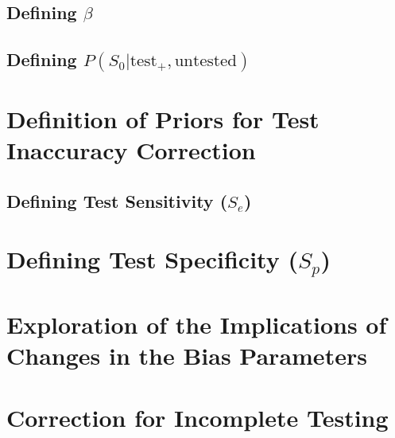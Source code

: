\documentclass[12pt,twoside]{smiththesis}
\begin{document}
\hypertarget{defining-beta}{%
\subsection{\texorpdfstring{Defining \(\beta\)}{Defining \textbackslash beta}}\label{defining-beta}}

\hypertarget{defining-ps_0texttest_textuntested}{%
\subsection{\texorpdfstring{Defining \(P(S_0|\text{test}_+,\text{untested})\)}{Defining P(S\_0\textbar\textbackslash text\{test\}\_+,\textbackslash text\{untested\})}}\label{defining-ps_0texttest_textuntested}}

\hypertarget{definition-of-priors-for-test-inaccuracy-correction}{%
\section{Definition of Priors for Test Inaccuracy Correction}\label{definition-of-priors-for-test-inaccuracy-correction}}

\hypertarget{defining-test-sensitivity-s_e}{%
\subsection{\texorpdfstring{Defining Test Sensitivity (\(S_e\))}{Defining Test Sensitivity (S\_e)}}\label{defining-test-sensitivity-s_e}}

\hypertarget{defining-test-specificity-s_p}{%
\section{\texorpdfstring{Defining Test Specificity (\(S_p\))}{Defining Test Specificity (S\_p)}}\label{defining-test-specificity-s_p}}

\hypertarget{exploration-of-the-implications-of-changes-in-the-bias-parameters}{%
\section{Exploration of the Implications of Changes in the Bias Parameters}\label{exploration-of-the-implications-of-changes-in-the-bias-parameters}}

\hypertarget{correction-for-incomplete-testing}{%
\section{Correction for Incomplete Testing}\label{correction-for-incomplete-testing}}
\end{document}
